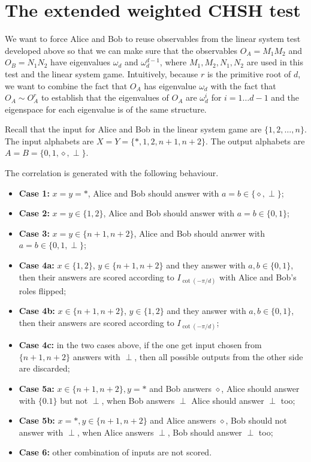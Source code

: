 \documentclass[11pt,letterpaper]{article}
\newcommand{\1}{\mathbb{1}}
\theoremstyle{definition}
\begin{document}
\section{The extended weighted CHSH test}
We want to force Alice and Bob to reuse observables 
from the linear system test developed above so that we can make sure that the observables 
$O_A = M_1M_2$ and $O_B =N_1N_2$ have eigenvalues $\omega_d$ and $\omega_d^{d-1}$,
where $M_1,M_2,N_1,N_2$ are used in this test and the linear system game.
Intuitively, because $r$ is the primitive root of $d$, 
we want to combine the fact that $O_A$ has eigenvalue $\omega_d$ with the fact that 
$O_A \sim O_A^r$ to establish that
the eigenvalues of $O_A$ are $\omega_d^i$ for $i =1 \dots d-1$ and the eigenspace for 
each eigenvalue is of the same structure.

Recall that the input for Alice and Bob in the linear system game are $\{1,2,\dots,n\}$.
The input alphabets are $X = Y = \{\ast, 1, 2, n+1,n+2\}$.
The output alphabets are $A = B = \{0, 1, \diamond, \perp\}$.

The correlation is generated with the following behaviour.
\begin{itemize}
	\item \textbf{Case 1:} $x = y = \ast$, Alice and Bob should answer with $a = b \in \{\diamond, \perp\}$;
	\item \textbf{Case 2:} $x = y \in \{1,2\}$, Alice and Bob should answer with $a = b \in \{0, 1\}$;
	\item \textbf{Case 3:} $x = y \in \{n+1, n+2\}$, Alice and Bob should answer with $a = b \in \{0, 1, \perp\}$;
	\item \textbf{Case 4a:} $x \in \{1,2\}$, $y \in \{n+1, n+2\}$ and they answer with $a,b \in \{0,1\}$, then
	their answers are scored according to $I_{\cot(-\pi/d)}$ with Alice and Bob's roles flipped;
	\item \textbf{Case 4b:} $x \in \{n+1, n+2\}$, $y \in \{1,2\}$ and they answer with $a,b \in \{0,1\}$, then
	their answers are scored according to $I_{\cot(-\pi/d)}$;
	\item \textbf{Case 4c:} in the two cases above, if the one get input chosen from $\{n+1,n+2\}$ answers
	 with $\perp$, then all possible outputs from the other side are discarded;
	\item \textbf{Case 5a:} $x \in \{n+1,n+2\}, y = \ast$ and Bob answers $\diamond$, Alice should answer with $\{0.1\}$ but not $\perp$, when Bob answers $\perp$ Alice should answer $\perp$ too;
	\item \textbf{Case 5b:} $x = \ast, y \in \{n+1, n+2\}$ and Alice answers $\diamond$, Bob should not answer with $\perp$,
	when Alice answers $\perp$, Bob should answer $\perp$ too;
	\item \textbf{Case 6:} other combination of inputs are not scored.
\end{itemize}
\end{document}
